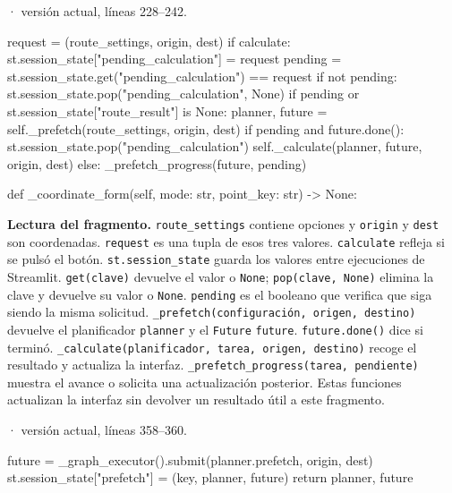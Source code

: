 \documentclass[11pt,a4paper]{article}
\begin{document}
\smallskip
{\footnotesize\texttt{} · versión actual, líneas 228--242.}\par
\begin{Codigo}[firstnumber=228]
        request = (route_settings, origin, dest)
        if calculate:
            st.session_state["pending_calculation"] = request
        pending = st.session_state.get("pending_calculation") == request
        if not pending:
            st.session_state.pop("pending_calculation", None)
        if pending or st.session_state["route_result"] is None:
            planner, future = self._prefetch(route_settings, origin, dest)
            if pending and future.done():
                st.session_state.pop("pending_calculation")
                self._calculate(planner, future, origin, dest)
            else:
                _prefetch_progress(future, pending)

    def _coordinate_form(self, mode: str, point_key: str) -> None:
\end{Codigo}

\textbf{Lectura del fragmento.} \texttt{route\_settings} contiene opciones y \texttt{origin} y \texttt{dest} son coordenadas. \texttt{request} es una tupla de esos tres valores. \texttt{calculate} refleja si se pulsó el botón. \texttt{st.session\_state} guarda los valores entre ejecuciones de Streamlit. \texttt{get(clave)} devuelve el valor o \texttt{None}; \texttt{pop(clave, None)} elimina la clave y devuelve su valor o \texttt{None}. \texttt{pending} es el booleano que verifica que siga siendo la misma solicitud. \texttt{\_prefetch(configuración, origen, destino)} devuelve el planificador \texttt{planner} y el \texttt{Future} \texttt{future}. \texttt{future.done()} dice si terminó. \texttt{\_calculate(planificador, tarea, origen, destino)} recoge el resultado y actualiza la interfaz. \texttt{\_prefetch\_progress(tarea, pendiente)} muestra el avance o solicita una actualización posterior. Estas funciones actualizan la interfaz sin devolver un resultado útil a este fragmento.


\smallskip
{\footnotesize\texttt{} · versión actual, líneas 358--360.}\par
\begin{Codigo}[firstnumber=358]
        future = _graph_executor().submit(planner.prefetch, origin, dest)
        st.session_state["prefetch"] = (key, planner, future)
        return planner, future
\end{Codigo}
\end{document}
